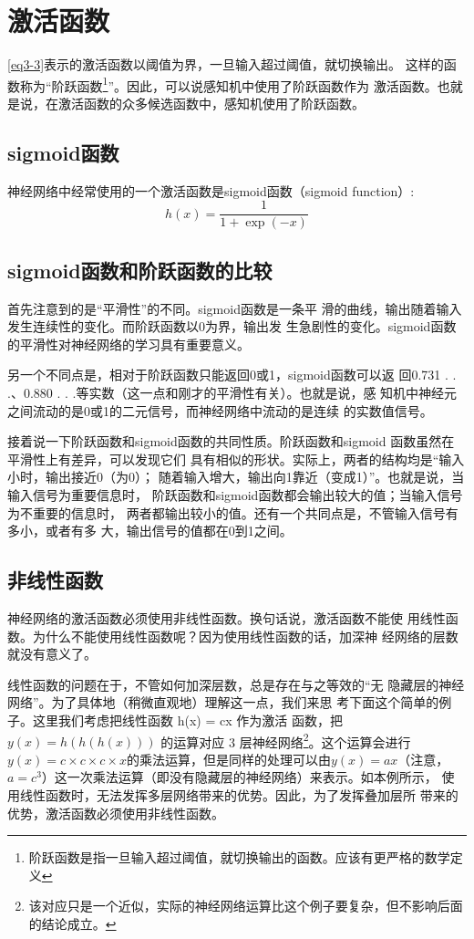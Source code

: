 \section{激活函数}
\autoref{eq3-3}表示的激活函数以阈值为界，一旦输入超过阈值，就切换输出。
这样的函数称为“阶跃函数\footnote{阶跃函数是指一旦输入超过阈值，就切换输出的函数。应该有更严格的数学定义}”。因此，可以说感知机中使用了阶跃函数作为
激活函数。也就是说，在激活函数的众多候选函数中，感知机使用了阶跃函数。
\subsection{sigmoid函数}
神经网络中经常使用的一个激活函数是sigmoid函数（sigmoid function）:
\begin{equation}
    h(x)=\frac{1}{1+\exp(-x)}
\end{equation}
\subsection{sigmoid函数和阶跃函数的比较}
首先注意到的是“平滑性”的不同。sigmoid函数是一条平
滑的曲线，输出随着输入发生连续性的变化。而阶跃函数以0为界，输出发
生急剧性的变化。sigmoid函数的平滑性对神经网络的学习具有重要意义。

另一个不同点是，相对于阶跃函数只能返回0或1，sigmoid函数可以返
回0.731 . . .、0.880 . . .等实数（这一点和刚才的平滑性有关）。也就是说，感
知机中神经元之间流动的是0或1的二元信号，而神经网络中流动的是连续
的实数值信号。

接着说一下阶跃函数和sigmoid函数的共同性质。阶跃函数和sigmoid
函数虽然在平滑性上有差异，可以发现它们
具有相似的形状。实际上，两者的结构均是“输入小时，输出接近0（为0）；
随着输入增大，输出向1靠近（变成1）”。也就是说，当输入信号为重要信息时，
阶跃函数和sigmoid函数都会输出较大的值；当输入信号为不重要的信息时，
两者都输出较小的值。还有一个共同点是，不管输入信号有多小，或者有多
大，输出信号的值都在0到1之间。

\subsection{非线性函数}
神经网络的激活函数必须使用非线性函数。换句话说，激活函数不能使
用线性函数。为什么不能使用线性函数呢？因为使用线性函数的话，加深神
经网络的层数就没有意义了。

线性函数的问题在于，不管如何加深层数，总是存在与之等效的“无
隐藏层的神经网络”。为了具体地（稍微直观地）理解这一点，我们来思
考下面这个简单的例子。这里我们考虑把线性函数 h(x) = cx 作为激活
函数，把 $y(x) = h(h(h(x)))$ 的运算对应 3 层神经网络\footnote{该对应只是一个近似，实际的神经网络运算比这个例子要复杂，但不影响后面的结论成立。}。这个运算会进行
$y(x) = c \times c \times c \times x$的乘法运算，但是同样的处理可以由$y(x) = ax$（注意，
$a = c^3$）这一次乘法运算（即没有隐藏层的神经网络）来表示。如本例所示，
使用线性函数时，无法发挥多层网络带来的优势。因此，为了发挥叠加层所
带来的优势，激活函数必须使用非线性函数。

